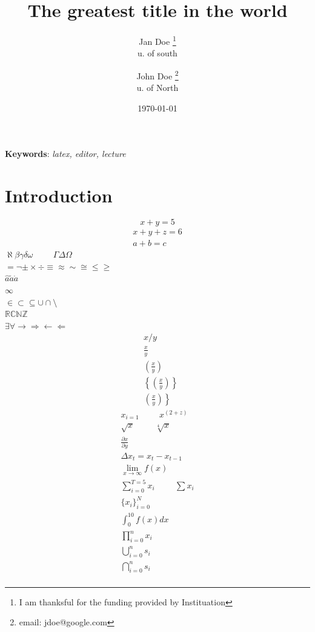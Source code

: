 \documentclass{article}
\title{The greatest title in the world}
\author{Jan Doe \thanks{I am thanksful for the funding provided by Instituation}\\u. of south \and John Doe \thanks{email: jdoe@google.com}\\u. of North}
\date{\today}
\begin{document}
\maketitle
\begin{abstract}
    \lipsum[1]
\end{abstract}

\textbf{Keywords}: \emph{latex, editor, lecture}

\section{Introduction}
\begin{equation}
    x+y=5 \label{eq:first}
\end{equation}
\begin{align}
    x+y+z=6 \label{eq:second} \\
    a+b=c
\end{align}
\(
\aleph \beta \gamma \delta \omega \hspace{1cm}  \Gamma \Delta \Omega 
\)\\
\(
= \neg \pm \times \div \equiv \approx \sim \cong \leq \geq
\)\\
\(
\hat{a} \tilde{a} \dot{a}
\)\\
\(
\infty
\)\\
\(
\in \subset \subseteq \cup \cap \setminus
\)\\
\(
\mathds{R} \mathds{C} \mathds{N} \mathds{Z}
\)\\
\(
\exists \forall \rightarrow \Rightarrow \leftarrow \Leftarrow
\)\\
\begin{align*}
    & x/y \\
    & \frac{x}{y} \\
    & \left( \frac{x}{y} \right) \\
    & \left\{ \left( \frac{x}{y} \right) \right\} 
\end{align*}
\begin{align*}
    \left. \left( \frac{x}{y} \right) \right\} 
\end{align*}
\begin{align*}
    x_{i=1} \hspace{1cm} x^{(2+z)}\\
    \sqrt{x} \hspace{1cm} \sqrt[4]{x}\\
    \frac{\partial x}{\partial y}\\
    \Delta x_t= x_{t}-x_{t-1}\\
    \lim_{x\rightarrow\infty}f(x)\\
    \sum_{i=0}^{T=5} x_i \hspace{1cm} \sum x_i\\
    \{x_i\}_{i=0}^{N}\\
    \int_{0}^{10} f(x) dx\\
    \prod_{i=0}^{n} x_i\\
    \bigcup_{i=0}^n s_i\\
    \bigcap_{i=0}^n s_i\\
\end{align*}
\end{document}
